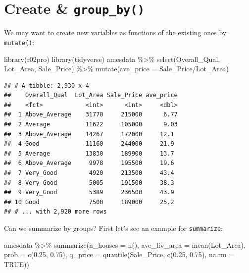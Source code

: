 \documentclass[
]{book}
\newenvironment{Shaded}{\begin{snugshade}}{\end{snugshade}}
\newcommand{\AttributeTok}[1]{\textcolor[rgb]{0.77,0.63,0.00}{#1}}
\newcommand{\ConstantTok}[1]{\textcolor[rgb]{0.00,0.00,0.00}{#1}}
\newcommand{\FloatTok}[1]{\textcolor[rgb]{0.00,0.00,0.81}{#1}}
\newcommand{\FunctionTok}[1]{\textcolor[rgb]{0.00,0.00,0.00}{#1}}
\newcommand{\NormalTok}[1]{#1}
\newcommand{\SpecialCharTok}[1]{\textcolor[rgb]{0.00,0.00,0.00}{#1}}
\begin{document}
\hypertarget{create-group_by}{%
\section{\texorpdfstring{Create \& \texttt{group\_by()}}{Create \& group\_by()}}\label{create-group_by}}

We may want to create new variables as functions of the existing ones by \texttt{mutate()}:

\begin{Shaded}
\begin{Highlighting}[]
\FunctionTok{library}\NormalTok{(r02pro)}
\FunctionTok{library}\NormalTok{(tidyverse)}
\NormalTok{amesdata }\SpecialCharTok{\%\textgreater{}\%} 
  \FunctionTok{select}\NormalTok{(Overall\_Qual, Lot\_Area, Sale\_Price) }\SpecialCharTok{\%\textgreater{}\%}
  \FunctionTok{mutate}\NormalTok{(}\AttributeTok{ave\_price =}\NormalTok{ Sale\_Price}\SpecialCharTok{/}\NormalTok{Lot\_Area) }
\end{Highlighting}
\end{Shaded}

\begin{verbatim}
## # A tibble: 2,930 x 4
##    Overall_Qual  Lot_Area Sale_Price ave_price
##    <fct>            <int>      <int>     <dbl>
##  1 Above_Average    31770     215000      6.77
##  2 Average          11622     105000      9.03
##  3 Above_Average    14267     172000     12.1 
##  4 Good             11160     244000     21.9 
##  5 Average          13830     189900     13.7 
##  6 Above_Average     9978     195500     19.6 
##  7 Very_Good         4920     213500     43.4 
##  8 Very_Good         5005     191500     38.3 
##  9 Very_Good         5389     236500     43.9 
## 10 Good              7500     189000     25.2 
## # ... with 2,920 more rows
\end{verbatim}

Can we summarize by groups? First let's see an example for \texttt{summarize}:

\begin{Shaded}
\begin{Highlighting}[]
\NormalTok{amesdata }\SpecialCharTok{\%\textgreater{}\%} 
  \FunctionTok{summarize}\NormalTok{(}\AttributeTok{n\_houses =} \FunctionTok{n}\NormalTok{(),}
            \AttributeTok{ave\_liv\_area =} \FunctionTok{mean}\NormalTok{(Lot\_Area),}
            \AttributeTok{prob =} \FunctionTok{c}\NormalTok{(}\FloatTok{0.25}\NormalTok{, }\FloatTok{0.75}\NormalTok{),}
            \AttributeTok{q\_price =} \FunctionTok{quantile}\NormalTok{(Sale\_Price, }\FunctionTok{c}\NormalTok{(}\FloatTok{0.25}\NormalTok{, }\FloatTok{0.75}\NormalTok{),}
                               \AttributeTok{na.rm =} \ConstantTok{TRUE}\NormalTok{))}
\end{Highlighting}
\end{Shaded}
\end{document}
